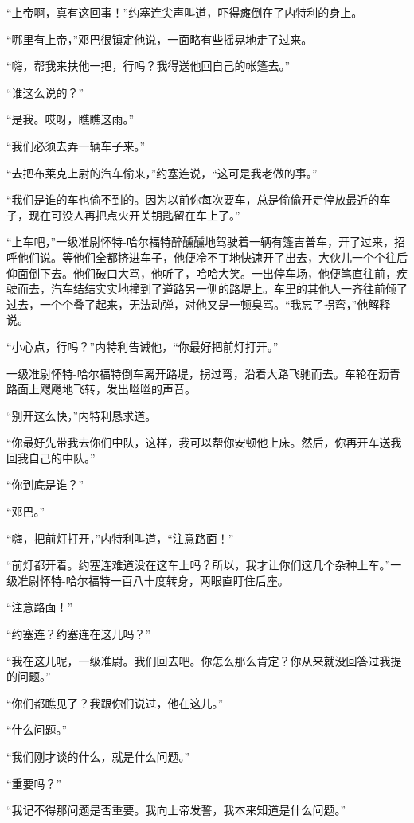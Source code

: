     “上帝啊，真有这回事！”约塞连尖声叫道，吓得瘫倒在了内特利的身上。

    “哪里有上帝，”邓巴很镇定他说，一面略有些摇晃地走了过来。

    “嗨，帮我来扶他一把，行吗？我得送他回自己的帐篷去。”

    “谁这么说的？”

    “是我。哎呀，瞧瞧这雨。”

    “我们必须去弄一辆车子来。”

    “去把布莱克上尉的汽车偷来，”约塞连说，“这可是我老做的事。”

    “我们是谁的车也偷不到的。因为以前你每次要车，总是偷偷开走停放最近的车子，现在可没人再把点火开关钥匙留在车上了。”

    “上车吧，”一级准尉怀特-哈尔福特醉醺醺地驾驶着一辆有篷吉普车，开了过来，招呼他们说。等他们全都挤进车子，他便冷不丁地快速开了出去，大伙儿一个个往后仰面倒下去。他们破口大骂，他听了，哈哈大笑。一出停车场，他便笔直往前，疾驶而去，汽车结结实实地撞到了道路另一侧的路堤上。车里的其他人一齐往前倾了过去，一个个叠了起来，无法动弹，对他又是一顿臭骂。“我忘了拐弯，”他解释说。

    “小心点，行吗？”内特利告诫他，“你最好把前灯打开。”

    一级准尉怀特-哈尔福特倒车离开路堤，拐过弯，沿着大路飞驰而去。车轮在沥青路面上飕飕地飞转，发出咝咝的声音。

    “别开这么快，”内特利恳求道。

    “你最好先带我去你们中队，这样，我可以帮你安顿他上床。然后，你再开车送我回我自己的中队。”

    “你到底是谁？”

    “邓巴。”

    “嗨，把前灯打开，”内特利叫道，“注意路面！”

    “前灯都开着。约塞连难道没在这车上吗？所以，我才让你们这几个杂种上车。”一级准尉怀特-哈尔福特一百八十度转身，两眼直盯住后座。

    “注意路面！”

    “约塞连？约塞连在这儿吗？”

    “我在这儿呢，一级准尉。我们回去吧。你怎么那么肯定？你从来就没回答过我提的问题。”

    “你们都瞧见了？我跟你们说过，他在这儿。”

    “什么问题。”

    “我们刚才谈的什么，就是什么问题。”

    “重要吗？”

    “我记不得那问题是否重要。我向上帝发誓，我本来知道是什么问题。”


